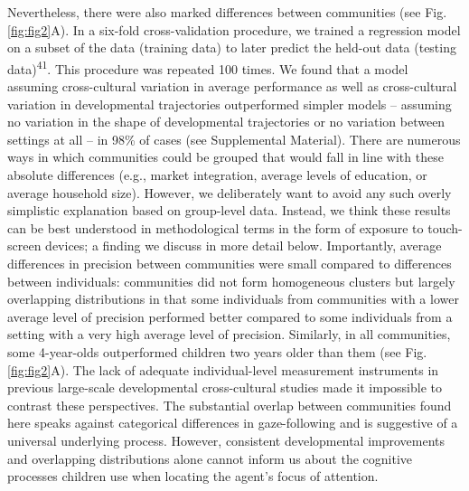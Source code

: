 \documentclass[
  man,floatsintext]{apa6}
\begin{document}
Nevertheless, there were also marked differences between communities (see Fig. \ref{fig:fig2}A). In a six-fold cross-validation procedure, we trained a regression model on a subset of the data (training data) to later predict the held-out data (testing data)\textsuperscript{41}. This procedure was repeated 100 times. We found that a model assuming cross-cultural variation in average performance as well as cross-cultural variation in developmental trajectories outperformed simpler models -- assuming no variation in the shape of developmental trajectories or no variation between settings at all -- in 98\% of cases (see Supplemental Material). There are numerous ways in which communities could be grouped that would fall in line with these absolute differences (e.g., market integration, average levels of education, or average household size). However, we deliberately want to avoid any such overly simplistic explanation based on group-level data. Instead, we think these results can be best understood in methodological terms in the form of exposure to touch-screen devices; a finding we discuss in more detail below. Importantly, average differences in precision between communities were small compared to differences between individuals: communities did not form homogeneous clusters but largely overlapping distributions in that some individuals from communities with a lower average level of precision performed better compared to some individuals from a setting with a very high average level of precision. Similarly, in all communities, some 4-year-olds outperformed children two years older than them (see Fig. \ref{fig:fig2}A). The lack of adequate individual-level measurement instruments in previous large-scale developmental cross-cultural studies made it impossible to contrast these perspectives. The substantial overlap between communities found here speaks against categorical differences in gaze-following and is suggestive of a universal underlying process. However, consistent developmental improvements and overlapping distributions alone cannot inform us about the cognitive processes children use when locating the agent's focus of attention.
\end{document}
